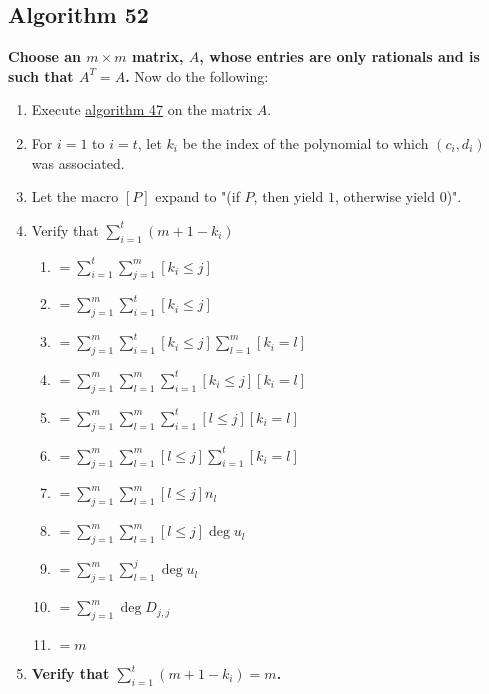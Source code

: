 \documentclass[twocolumn]{article}
\begin{document}
		\subsection{Algorithm 52}\label{sec:algorithm 52}
			\textbf{Choose an $m\times m$ matrix, $A$, whose entries are only rationals and is such that $A^T=A$.} Now do the following:
			\begin{enumerate}
				\item Execute \hyperref[sec:algorithm 47]{algorithm 47} on the matrix $A$.
				\item For $i=1$ to $i=t$, let $k_i$ be the index of the polynomial to which $(c_i, d_i)$ was associated.
				\item Let the macro $[P]$ expand to "(if $P$, then yield $1$, otherwise yield $0$)".
				\item Verify that $\sum_{i=1}^t(m+1-k_i)$
				\begin{enumerate}
					\item $=\sum_{i=1}^t\sum_{j=1}^m [k_i\le j]$
					\item $=\sum_{j=1}^m\sum_{i=1}^t [k_i\le j]$
					\item $=\sum_{j=1}^m\sum_{i=1}^t [k_i\le j]\sum_{l=1}^m [k_i=l]$
					\item $=\sum_{j=1}^m\sum_{l=1}^m\sum_{i=1}^t [k_i\le j][k_i=l]$
					\item $=\sum_{j=1}^m\sum_{l=1}^m\sum_{i=1}^t [l\le j][k_i=l]$
					\item $=\sum_{j=1}^m\sum_{l=1}^m [l\le j]\sum_{i=1}^t [k_i=l]$
					\item $=\sum_{j=1}^m\sum_{l=1}^m [l\le j]n_l$
					\item $=\sum_{j=1}^m\sum_{l=1}^m [l\le j]\deg u_l$
					\item $=\sum_{j=1}^m\sum_{l=1}^j \deg u_l$
					\item $=\sum_{j=1}^m \deg D_{j,j}$
					\item $=m$
				\end{enumerate}
				\item \textbf{Verify that $\sum_{i=1}^t(m+1-k_i)=m$.}
			\end{enumerate}
\end{document}
